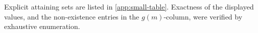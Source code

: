 \documentclass[11pt]{article}
\begin{document}
	
	Explicit attaining sets are listed in \cref{app:small-table}. Exactness of the displayed values, and the non-existence entries in the
	\(g(m)\)-column, were verified by exhaustive enumeration.
	
\end{document}
